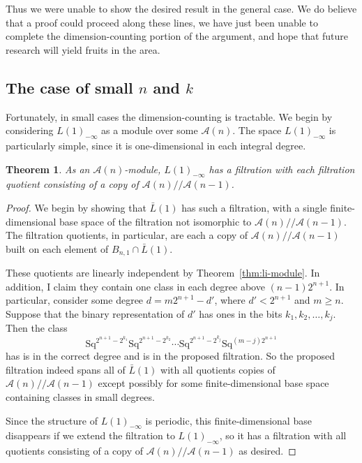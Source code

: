\documentclass{article}
\newcommand{\A}{\mathcal{A}}
\newcommand{\Sq}{\mathrm{Sq}}
\newcommand{\mmod}{/\!/\!}
\renewcommand{\L}{\bar{L}}
\newcommand{\Lkm}[1][k]{L{(#1)}_{-\infty}}
\newtheorem{thm}{Theorem}
\begin{document}
Thus we were unable to show the desired result in the general case.  We do believe that a proof could proceed along these lines, we have just been unable to complete the dimension-counting portion of the argument, and hope that future research will yield fruits in the area.

\subsection{The case of small \boldmath$n$ and \boldmath$k$}

Fortunately, in small cases the dimension-counting is tractable.  We begin by considering $\Lkm[1]$ as a module over some $\A(n)$.  The space $\Lkm[1]$ is particularly simple, since it is one-dimensional in each integral degree.

\begin{thm}
  As an $\A(n)$-module, $\Lkm[1]$ has a filtration with each filtration quotient consisting of a copy of $\A(n)\mmod\A(n-1)$.
\end{thm}
\begin{proof}
  We begin by showing that $\L(1)$ has such a filtration, with a single finite-dimensional base space of the filtration not isomorphic to $\A(n)\mmod\A(n-1)$.  The filtration quotients, in particular, are each a copy of $\A(n)\mmod\A(n-1)$ built on each element of $B_{n,1}\cap\L(1)$.

  These quotients are linearly independent by Theorem~\ref{thm:li-module}.  In addition, I claim they contain one class in each degree above $(n-1)2^{n+1}$.  In particular, consider some degree $d = m2^{n+1} - d'$, where $d' < 2^{n+1}$ and $m \geq n$.  Suppose that the binary representation of $d'$ has ones in the bits $k_1, k_2, \ldots, k_j$.  Then the class 
  \[\Sq^{2^{n+1}-2^{k_1}}\Sq^{2^{n+1}-2^{k_2}}\cdots\Sq^{2^{n+1}-2^{k_j}}\Sq^{(m-j)2^{n+1}} \]
  has is in the correct degree and is in the proposed filtration.  So the proposed filtration indeed spans all of $\L(1)$ with all quotients copies of $\A(n)\mmod\A(n-1)$ except possibly for some finite-dimensional base space containing classes in small degrees.

  Since the structure of $\Lkm[1]$ is periodic, this finite-dimensional base disappears if we extend the filtration to $\Lkm[1]$, so it has a filtration with all quotients consisting of a copy of $\A(n)\mmod\A(n-1)$ as desired.
\end{proof}

\end{document}
